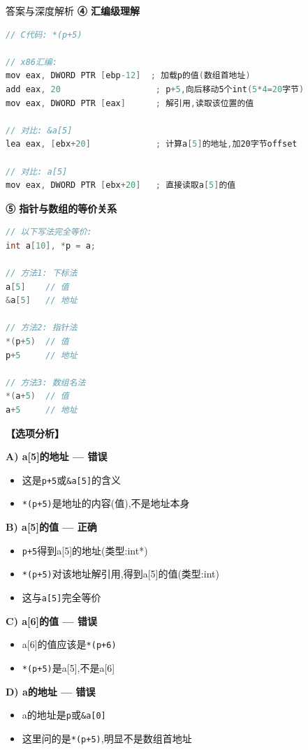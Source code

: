 \documentclass[a4paper,12pt]{article}
\begin{document}
\begin{bluebox}{答案与深度解析}
	\textbf{④ 汇编级理解}
	\begin{lstlisting}[language=C]
// C代码: *(p+5)

// x86汇编:
mov eax, DWORD PTR [ebp-12]  ; 加载p的值(数组首地址)
add eax, 20                   ; p+5,向后移动5个int(5*4=20字节)
mov eax, DWORD PTR [eax]      ; 解引用,读取该位置的值

// 对比: &a[5]
lea eax, [ebx+20]             ; 计算a[5]的地址,加20字节offset

// 对比: a[5]
mov eax, DWORD PTR [ebx+20]   ; 直接读取a[5]的值
    \end{lstlisting}

	\textbf{⑤ 指针与数组的等价关系}
	\begin{lstlisting}[language=C]
// 以下写法完全等价:
int a[10], *p = a;

// 方法1: 下标法
a[5]    // 值
&a[5]   // 地址

// 方法2: 指针法
*(p+5)  // 值
p+5     // 地址

// 方法3: 数组名法
*(a+5)  // 值
a+5     // 地址
    \end{lstlisting}

	\textbf{【选项分析】}

	\textbf{A) a[5]的地址 — 错误}
	\begin{itemize}[leftmargin=*, nosep]
		\item 这是\texttt{p+5}或\texttt{\&a[5]}的含义
		\item \texttt{*(p+5)}是地址的内容(值),不是地址本身
	\end{itemize}

	\textbf{B) a[5]的值 — 正确}
	\begin{itemize}[leftmargin=*, nosep]
		\item \texttt{p+5}得到a[5]的地址(类型:int*)
		\item \texttt{*(p+5)}对该地址解引用,得到a[5]的值(类型:int)
		\item 这与\texttt{a[5]}完全等价
	\end{itemize}

	\textbf{C) a[6]的值 — 错误}
	\begin{itemize}[leftmargin=*, nosep]
		\item a[6]的值应该是\texttt{*(p+6)}
		\item \texttt{*(p+5)}是a[5],不是a[6]
	\end{itemize}

	\textbf{D) a的地址 — 错误}
	\begin{itemize}[leftmargin=*, nosep]
		\item a的地址是\texttt{p}或\texttt{\&a[0]}
		\item 这里问的是\texttt{*(p+5)},明显不是数组首地址
	\end{itemize}


\end{bluebox}
\end{document}
